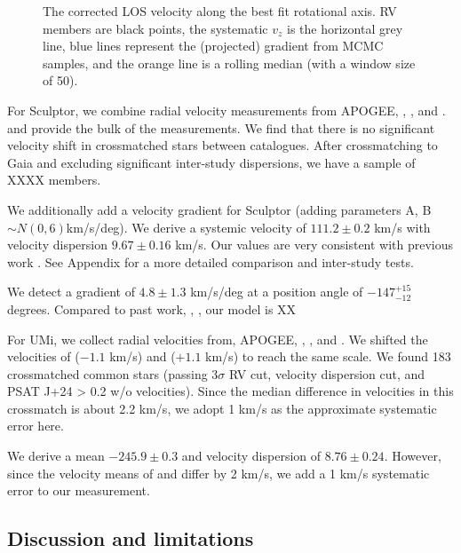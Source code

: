 \begin{figure}
\centering
{}
\caption[Scl velocity gradient]{The corrected LOS velocity along the
best fit rotational axis. RV members are black points, the systematic
\(v_z\) is the horizontal grey line, blue lines represent the
(projected) gradient from MCMC samples, and the orange line is a rolling
median (with a window size of 50).}
\end{figure}

For Sculptor, we combine radial velocity measurements from APOGEE,
\citet{sestito+2023a}, \citet{tolstoy+2023}, and \citet{WMO2009}.
\citet{tolstoy+2023} and \citet{WMO2009} provide the bulk of the
measurements. We find that there is no significant velocity shift in
crossmatched stars between catalogues. After crossmatching to Gaia and
excluding significant inter-study dispersions, we have a sample of XXXX
members.

We additionally add a velocity gradient for Sculptor (adding parameters
A, B \(\sim N(0, 6)\)km/s/deg). We derive a systemic velocity of
\(111.2\pm0.2\) km/s with velocity dispersion \(9.67\pm0.16\) km/s. Our
values are very consistent with previous work
\citep[e.g.][\citet{arroyo-polonio+2024},
\citet{tolstoy+2023}]{WMO2009}. See Appendix for a more detailed
comparison and inter-study tests.

We detect a gradient of \(4.8\pm1.3\) km/s/deg at a position angle of
\(-147_{-12}^{+15}\) degrees. Compared to past work,
\citet{battaglia+2008}, \citet{arroyo-polonio+2024}, our model is XX

For UMi, we collect radial velocities from, APOGEE,
\citet{sestito+2023b}, \citet{pace+2020}, and \citet{spencer+2018}. We
shifted the velocities of \citet{spencer+2018} (\(-1.1\) km/s) and
\citet{pace+2020} (\(+1.1\) km/s) to reach the same scale. We found 183
crossmatched common stars (passing 3\(\sigma\) RV cut, velocity
dispersion cut, and PSAT J+24 \textgreater{} 0.2 w/o velocities). Since
the median difference in velocities in this crossmatch is about 2.2
km/s, we adopt 1 km/s as the approximate systematic error here.

We derive a mean \(-245.9\pm0.3\) and velocity dispersion of
\(8.76\pm0.24\). However, since the velocity means of
\citet{spencer+2018} and \citet{pace+2020} differ by 2 km/s, we add a 1
km/s systematic error to our measurement.

\subsection{Discussion and
limitations}\label{discussion-and-limitations}

